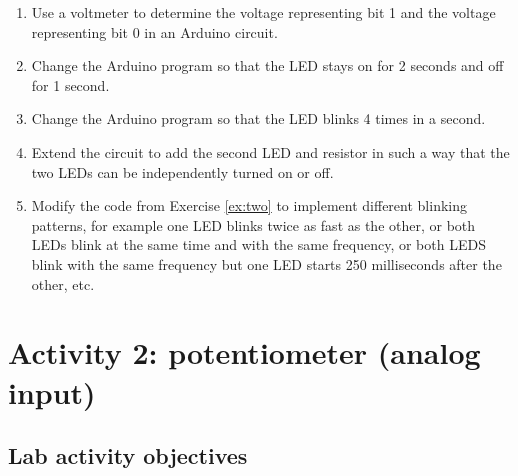 \documentclass[12pt]{book}
\begin{document}
\begin{enumerate}[1.]
\item\label{ex:measure} Use a voltmeter to determine the voltage
  representing bit 1 and the voltage representing bit 0 in an Arduino
  circuit.

\item Change the Arduino program so that the LED stays on for 2
  seconds and off for 1 second.

\item Change the Arduino program so that the LED blinks 4 times in a
  second.

\item\label{ex:two} Extend the circuit to add the second LED and
  resistor in such a way that the two LEDs can be independently turned
  on or off. 

\item Modify the code from Exercise \ref*{ex:two} to implement
  different blinking patterns, for example one LED blinks twice as
  fast as the other, or both LEDs blink at the same time and with the
  same frequency, or both LEDS blink with the same frequency but one
  LED starts 250 milliseconds after the other, etc.
\end{enumerate}


\chapter{Activity 2: potentiometer (analog input)}\label{se:pot}

\section{Lab activity objectives}
\end{document}
